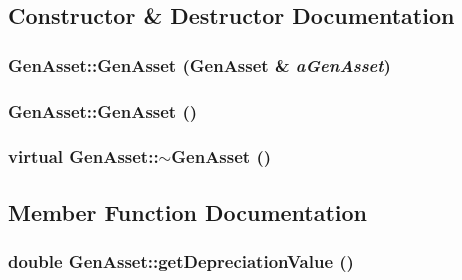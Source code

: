 \subsection{Constructor \& Destructor Documentation}
\hypertarget{class_gen_asset_aeb05b8f8aee098518c6c0bea0f56a4ef}{
\subsubsection[{GenAsset}]{\setlength{\rightskip}{0pt plus 5cm}GenAsset::GenAsset ({\bf GenAsset} \& {\em aGenAsset})}}
\label{class_gen_asset_aeb05b8f8aee098518c6c0bea0f56a4ef}
\hypertarget{class_gen_asset_ae5e36b860c07c895aeb3c4ccb5a0ed21}{
\subsubsection[{GenAsset}]{\setlength{\rightskip}{0pt plus 5cm}GenAsset::GenAsset ()}}
\label{class_gen_asset_ae5e36b860c07c895aeb3c4ccb5a0ed21}
\hypertarget{class_gen_asset_aab7ff58fdbc2be8f8fa8dffce8eb7e60}{
\subsubsection[{$\sim$GenAsset}]{\setlength{\rightskip}{0pt plus 5cm}virtual GenAsset::$\sim$GenAsset ()}}
\label{class_gen_asset_aab7ff58fdbc2be8f8fa8dffce8eb7e60}


\subsection{Member Function Documentation}
\hypertarget{class_gen_asset_abb1f15e982bee528c0be96e78764ec6b}{
\subsubsection[{getDepreciationValue}]{\setlength{\rightskip}{0pt plus 5cm}double GenAsset::getDepreciationValue ()}}
\label{class_gen_asset_abb1f15e982bee528c0be96e78764ec6b}


